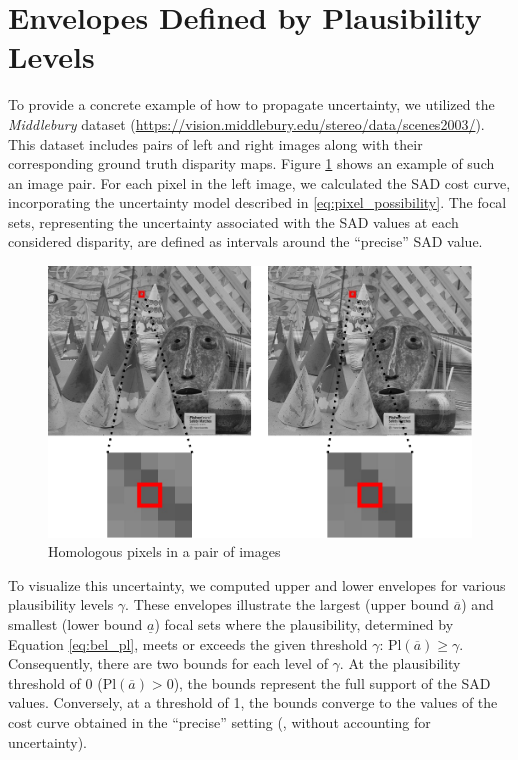 \section{Envelopes Defined by Plausibility Levels}
To provide a concrete example of how to propagate uncertainty, we utilized the \textit{Middlebury} dataset (\url{https://vision.middlebury.edu/stereo/data/scenes2003/}). This dataset includes pairs of left and right images along with their corresponding ground truth disparity maps. Figure \ref{fig:Cones} shows an example of such an image pair.
For each pixel in the left image, we calculated the SAD cost curve, incorporating the uncertainty model described in \eqref{eq:pixel_possibility}. The focal sets, representing the uncertainty associated with the SAD values at each considered disparity, are defined as intervals around the ``precise'' SAD value.

\begin{figure}[ht]
  \centering
  \includegraphics[width=0.8\linewidth]{Images/Cones.png}
  \caption{Homologous pixels in a pair of images}\label{fig:Cones}
\end{figure}

To visualize this uncertainty, we computed upper and lower envelopes for various plausibility levels $\gamma$. These envelopes illustrate the largest (upper bound $\overline{a}$) and smallest (lower bound $\underline{a}$) focal sets where the plausibility, determined by Equation \eqref{eq:bel_pl}, meets or exceeds the given threshold $\gamma$: $\mathrm{Pl}(\overline{a}) \geqslant \gamma$. Consequently, there are two bounds for each level of $\gamma$.
At the plausibility threshold of 0 ($\mathrm{Pl}(\overline{a}) > 0$), the bounds represent the full support of the SAD values. Conversely, at a threshold of 1, the bounds converge to the values of the cost curve obtained in the ``precise'' setting (\ie, without accounting for uncertainty).

